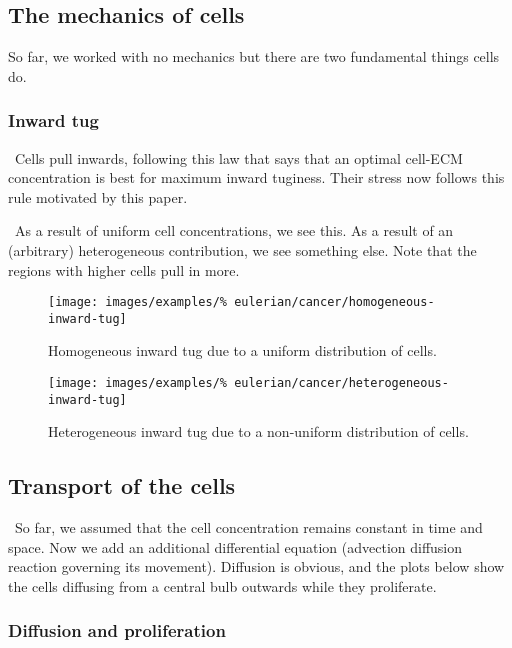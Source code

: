 \subsection{The mechanics of cells}
\label{cell-roles}

So far, we worked with no mechanics but there are two fundamental
things cells do.

\subsubsection{Inward tug}
\label{inward-tug}

\textbullet\ Cells pull inwards, following this law that says that an
optimal cell-ECM concentration is best for maximum inward
tuginess. Their stress now follows this rule motivated by this paper.

\textbullet\ As a result of uniform cell concentrations, we see
this. As a result of an (arbitrary) heterogeneous contribution, we see
something else. Note that the regions with higher cells pull in more.

\begin{figure}[!hptb]
\centering
\texttt{[image: images/examples/\%
eulerian/cancer/homogeneous-inward-tug]}
\caption{Homogeneous inward tug due to a uniform distribution of cells.}
\label{tumour-homogeneous-inward-tug}
\end{figure}

\begin{figure}[!hptb]
\centering
\texttt{[image: images/examples/\%
eulerian/cancer/heterogeneous-inward-tug]}
\caption{Heterogeneous inward tug due to a non-uniform distribution of cells.}
\label{tumour-heterogeneous-inward-tug}
\end{figure}

\clearpage

\subsection{Transport of the cells}
\label{cell-transport}

\textbullet\ So far, we assumed that the cell concentration remains
constant in time and space. Now we add an additional differential
equation (advection diffusion reaction governing its
movement). Diffusion is obvious, and the plots below show the cells
diffusing from a central bulb outwards while they proliferate.

\subsubsection{Diffusion and proliferation}
\label{cell-diffusion-proliferation}

